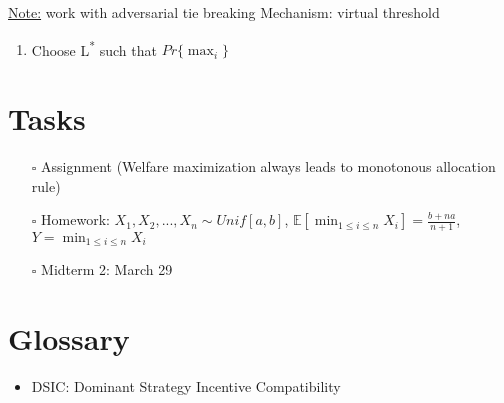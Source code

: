 \documentclass[11pt]{article}
\begin{document}
\uline{Note:} work with adversarial tie breaking
Mechanism: virtual threshold
\begin{enumerate}
\item Choose L\textsuperscript{*} such that \(Pr \{ \max_i\}\)
\end{enumerate}
\section{Tasks}
\label{sec:orgba605b6}
\begin{itemize}
\item[{$\square$}] Assignment (Welfare maximization always leads to monotonous allocation rule)
\item[{$\square$}] Homework: \(X_1, X_2, ..., X_n \sim Unif[a, b]\), \(\mathbb{E} [\min_{1 \leq i \leq n} X_i] = \frac{b + na}{n + 1}\), \(Y = \min_{1 \leq i \leq n}X_{i}\)
\item[{$\square$}] Midterm 2: March 29
\end{itemize}

\section{Glossary}
\label{sec:orge09c61b}
\begin{itemize}
\item DSIC: Dominant Strategy Incentive Compatibility
\end{itemize}
\end{document}

